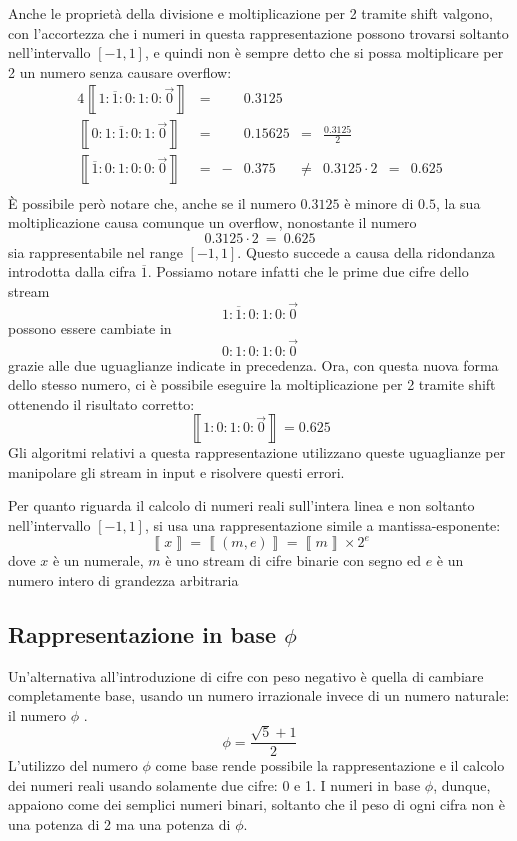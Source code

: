 \documentclass[Lau]{sapthesis}
\begin{document}
Anche le proprietà della divisione e moltiplicazione per 2 tramite shift valgono, con l'accortezza che i numeri in questa rappresentazione possono trovarsi soltanto nell'intervallo $\left[-1,1\right]$, e quindi non è sempre detto che si possa moltiplicare per 2 un numero senza causare overflow:
\begin{alignat*}{4}
\left\llbracket1:\overline{1}:0:1:0:\overrightarrow{0}\right\rrbracket &{}={}& &0.3125\\
\left\llbracket0:1:\overline{1}:0:1:\overrightarrow{0}\right\rrbracket &{}={}& &0.15625 &{}={}& \frac{0.3125}{2}\\
\left\llbracket\overline{1}:0:1:0:0:\overrightarrow{0}\right\rrbracket &{}={}& -&0.375 &{}\neq{}& 0.3125 \cdot 2 &{}={}& 0.625\\
\end{alignat*}
È possibile però notare che, anche se il numero $0.3125$ è minore di $0.5$, la sua moltiplicazione causa comunque un overflow, nonostante il numero
$$0.3125 \cdot 2\ =\ 0.625$$
sia rappresentabile nel range $\left[-1,1\right]$. Questo succede a causa della ridondanza introdotta dalla cifra $\overline{1}$. Possiamo notare infatti che le prime due cifre dello stream
$$1:\overline{1}:0:1:0:\overrightarrow{0}$$
possono essere cambiate in
$$0:1:0:1:0:\overrightarrow{0}$$
grazie alle due uguaglianze indicate in precedenza. Ora, con questa nuova forma dello stesso numero, ci è possibile eseguire la moltiplicazione per 2 tramite shift ottenendo il risultato corretto:
$$\left\llbracket1:0:1:0:\overrightarrow{0}\right\rrbracket = 0.625$$
Gli algoritmi relativi a questa rappresentazione utilizzano queste uguaglianze per manipolare gli stream in input e risolvere questi errori.

Per quanto riguarda il calcolo di numeri reali sull'intera linea e non soltanto nell'intervallo $\left[-1,1\right]$, si usa una rappresentazione simile a mantissa-esponente:
$$\left\llbracket x \right\rrbracket = \left\llbracket (m, e) \right\rrbracket = \left\llbracket m \right\rrbracket \times 2^e$$
dove $x$ è un numerale, $m$ è uno stream di cifre binarie con segno ed $e$ è un numero intero di grandezza arbitraria

\subsection{Rappresentazione in base $\phi$}
Un'alternativa all'introduzione di cifre con peso negativo è quella di cambiare completamente base, usando un numero irrazionale invece di un numero naturale: il numero $\phi$ \cite{PietroDiGianantonio}.
$$\phi = \frac{\sqrt{5}+1}{2}$$
L'utilizzo del numero $\phi$ come base rende possibile la rappresentazione e il calcolo dei numeri reali usando solamente due cifre: 0 e 1. I numeri in base $\phi$, dunque, appaiono come dei semplici numeri binari, soltanto che il peso di ogni cifra non è una potenza di 2 ma una potenza di $\phi$.
\end{document}
